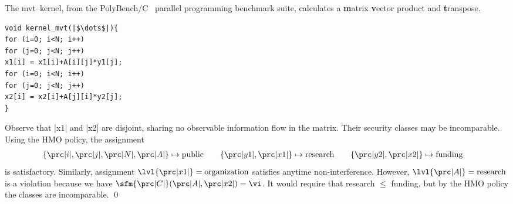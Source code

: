 \begin{example}
The mvt--kernel, from the {PolyBench/C}~\cite{polybenchc}
parallel programming benchmark suite, calculates a \textbf{m}atrix \textbf{v}ector product and \textbf{t}ranspose.

\noindent\begin{center}
\begin{minipage}{.65\textwidth}
\begin{lstlisting}
void kernel_mvt(|$\dots$|){
for (i=0; i<N; i++)
for (j=0; j<N; j++)
x1[i] = x1[i]+A[i][j]*y1[j];
for (i=0; i<N; i++)
for (j=0; j<N; j++)
x2[i] = x2[i]+A[j][i]*y2[j];
}
\end{lstlisting}
\end{minipage}\hfill
\scalebox{.85}{$\begin{pNiceMatrix}[first-row,first-col]
& \prc|i|  & \prc|j| & \prc|N| & \prc|x1| & \prc|x2| & \prc|y1| & \prc|y2| & \prc|A| \\
\prc|i|   & \nv & \vi & \nv & \vi & \vi & \nv & \nv & \nv  \\
\prc|j|   & \nv & \nv & \nv & \vi & \vi & \nv & \nv & \nv  \\
\prc|N|   & \vi & \vi & \nv & \vi & \vi & \nv & \nv & \nv  \\
\prc|x1|  & \nv & \nv & \nv & \nv & \nv & \nv & \nv & \nv  \\
\prc|x2|  & \nv & \nv & \nv & \nv & \nv & \nv & \nv & \nv  \\
\prc|y1|  & \nv & \nv & \nv & \vi & \nv & \nv & \nv & \nv  \\
\prc|y2|  & \nv & \nv & \nv & \nv & \vi & \nv & \nv & \nv  \\
\prc|A|   & \nv & \nv & \nv & \vi & \vi & \nv & \nv & \nv  \\
\end{pNiceMatrix}$}\end{center}
Observe that \prc|x1| and \prc|x2| are disjoint, sharing no observable information flow in the matrix.
Their security classes may be incomparable.
Using the HMO policy, the assignment
\begin{align*}
\{\prc|i|, \prc|j|, \prc|N|, \prc|A|\} &\mapsto \text{public} &&&
\{\prc|y1|, \prc|x1|\} & \mapsto \text{research} &&&
\{\prc|y2|, \prc|x2|\} & \mapsto \text{funding}
\end{align*}
is satisfactory.
Similarly, assignment \(\lvl{\prc|x1|} = \text{organization}\) satisfies anytime non-interference.
However, \(\lvl{\prc|A|} = \text{research}\) is a violation because
we have $\sfm{\prc|C|}(\prc|A|,\prc|x2|)=\vi$.
It would require that research $\leqslant$ funding, but by the HMO policy the classes are incomparable.
\qed\end{example}


